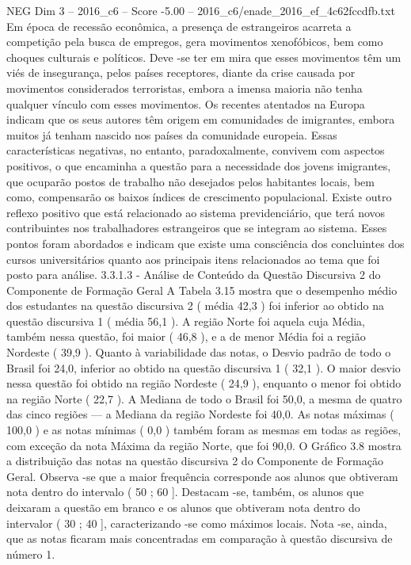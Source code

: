 \begin{textsample}{NEG Dim 3 – 2016\_c6 – Score -5.00 – 2016\_c6/enade\_2016\_ef\_4c62fccdfb.txt}
Em época de recessão econômica, a presença de estrangeiros acarreta a competição pela busca de empregos, gera movimentos xenofóbicos, bem como choques culturais e políticos.
Deve -se ter em mira que esses movimentos têm um viés de insegurança, pelos países receptores, diante da crise causada por movimentos considerados terroristas, embora a imensa maioria não tenha qualquer vínculo com esses movimentos.
Os recentes atentados na Europa indicam que os seus autores têm origem em comunidades de imigrantes, embora muitos já tenham nascido nos países da comunidade europeia.
Essas características negativas, no entanto, paradoxalmente, convivem com aspectos positivos, o que encaminha a questão para a necessidade dos jovens imigrantes, que ocuparão postos de trabalho não desejados pelos habitantes locais, bem como, compensarão os baixos índices de crescimento populacional.
Existe outro reflexo positivo que está relacionado ao sistema previdenciário, que terá novos contribuintes nos trabalhadores estrangeiros que se integram ao sistema.
Esses pontos foram abordados e indicam que existe uma consciência dos concluintes dos cursos universitários quanto aos principais itens relacionados ao tema que foi posto para análise. 3.3.1.3 - Análise de Conteúdo da Questão Discursiva 2 do Componente de Formação Geral A Tabela 3.15 mostra que o desempenho médio dos estudantes na questão discursiva 2 ( média 42,3 ) foi inferior ao obtido na questão discursiva 1 ( média 56,1 ).
A região Norte foi aquela cuja Média, também nessa questão, foi maior ( 46,8 ), e a de menor Média foi a região Nordeste ( 39,9 ).
Quanto à variabilidade das notas, o Desvio padrão de todo o Brasil foi 24,0, inferior ao obtido na questão discursiva 1 ( 32,1 ).
O maior desvio nessa questão foi obtido na região Nordeste ( 24,9 ), enquanto o menor foi obtido na região Norte ( 22,7 ).
A Mediana de todo o Brasil foi 50,0, a mesma de quatro das cinco regiões — a Mediana da região Nordeste foi 40,0.
As notas máximas ( 100,0 ) e as notas mínimas ( 0,0 ) também foram as mesmas em todas as regiões, com exceção da nota Máxima da região Norte, que foi 90,0.
O Gráfico 3.8 mostra a distribuição das notas na questão discursiva 2 do Componente de Formação Geral.
Observa -se que a maior frequência corresponde aos alunos que obtiveram nota dentro do intervalo ( 50 ; 60 ].
Destacam -se, também, os alunos que deixaram a questão em branco e os alunos que obtiveram nota dentro do intervalor ( 30 ; 40 ], caracterizando -se como máximos locais.
Nota -se, ainda, que as notas ficaram mais concentradas em comparação à questão discursiva de número 1.

\end{textsample}
